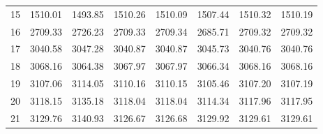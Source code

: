 \documentclass[10pt,oneside]{article}
\begin{document}
\begin{table}[h!]
\begin{tabular}{cccccccc}
15 &   1510.01 & 1493.85 & 1510.26 &    1510.09 &      1507.44 & 1510.32 &   1510.19 \\
16 &   2709.33 & 2726.23 & 2709.33 &    2709.34 &      2685.71 & 2709.32 &   2709.32 \\
17 &   3040.58 & 3047.28 & 3040.87 &    3040.87 &      3045.73 & 3040.76 &   3040.76 \\
18 &   3068.16 & 3064.38 & 3067.97 &    3067.97 &      3066.34 & 3068.16 &   3068.16 \\
19 &   3107.06 & 3114.05 & 3110.16 &    3110.15 &      3105.46 & 3107.20 &   3107.19 \\
20 &   3118.15 & 3135.18 & 3118.04 &    3118.04 &      3114.34 & 3117.96 &   3117.95 \\
21 &   3129.76 & 3140.93 & 3126.67 &    3126.68 &      3129.92 & 3129.61 &   3129.61 \\
\bottomrule
\end{tabular}
\end{table}
\end{document}
